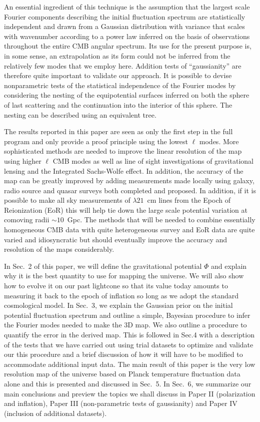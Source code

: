 \documentclass[useAMS,usenatbib,a4paper]{mn2e}
\begin{document}
An essential ingredient of this technique is the assumption that the largest scale Fourier components describing the initial fluctuation spectrum are statistically independent and drawn from a Gaussian distribution with variance that scales with wavenumber according to a power law inferred on the basis of observations throughout the entire CMB angular spectrum. Its use for the present purpose is, in some sense, an extrapolation as its form could not be inferred from the relatively few modes that we employ here. Addition tests of ``gaussianity'' are therefore quite important to validate our approach. It is possible to devise nonparametric tests of the statistical independence of the Fourier modes by considering the nesting of the equipotential surfaces inferred on both the sphere of last scattering and the continuation into the interior of this sphere. The nesting can be described using an equivalent tree.

The results reported in this paper are seen as only the first step in the full program and only provide a proof principle using the lowest $\ell$ modes. More sophisticated methods are needed to improve the linear resolution of the map using higher $\ell$ CMB modes as well as line of sight investigations of gravitational lensing and the Integrated Sachs-Wolfe effect. In addition, the accuracy of the map can be greatly improved by adding measurements made locally using galaxy, radio source and quasar surveys both completed and proposed. In addition, if it is possible to make all sky measurements of $\lambda21$~cm lines from the Epoch of Reionization (EoR) this will help tie down the large scale potential variation at comoving radii $\sim10$~Gpc. The methods that will be needed to combine essentially homogeneous CMB data with quite heterogeneous survey and EoR data are quite varied and idiosyncratic but should eventually improve the accuracy and resolution of the maps considerably.

In Sec.~2 of this paper, we will define the gravitational potential $\Phi$ and explain why it is the best quantity to use for mapping the universe. We will also show how to evolve it on our past lightcone so that its value today amounts to measuring it back to the epoch of inflation so long as we adopt the standard cosmological model. In Sec.~3, we explain the Gaussian prior on the initial potential fluctuation spectrum and outline a simple, Bayesian procedure to infer the Fourier modes needed to make the 3D map. We also outline a procedure to quantify the error in the derived map. This is followed in Sec.4 with a description of the tests that we have carried out using trial datasets to optimize and validate our this procedure and a brief discussion of how it will have to be modified to accommodate additional input data. The main result of this paper is the very low resolution map of the universe based on Planck temperature fluctuation data alone and this is presented and discussed in Sec.~5. In Sec.~6, we summarize our main conclusions and preview the topics we shall discuss in Paper II (polarization and inflation), Paper III (non-parametric tests of gaussianity) and Paper IV (inclusion of additional datasets). 
\end{document}
